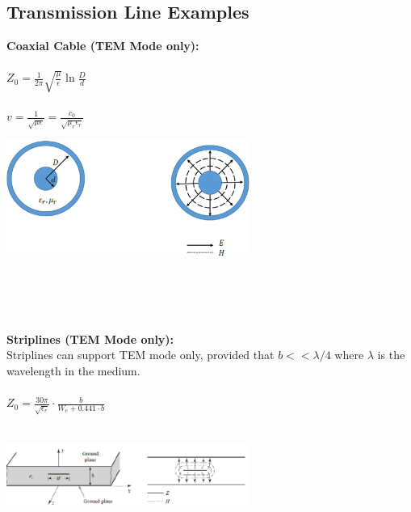 \subsection{Transmission Line Examples}

\begin{minipage}{6cm}
	\textbf{Coaxial Cable (TEM Mode only):}\\ \\
	$ Z_0 = \frac{1}{2\pi}\sqrt{\frac{\mu}{\epsilon}}\ln\frac{D}{d}$\\ \\
	$ v = \frac{1}{\sqrt{\mu \epsilon}} = \frac{c_0}{\sqrt{\mu_r \epsilon_r}}$
\end{minipage}
\hspace{4cm}
\begin{minipage}{8cm}
	\includegraphics[width=8cm]{./images/Coax.png}
\end{minipage}
\\
\\
\\
\begin{minipage}{6cm}
	\textbf{Striplines (TEM Mode only):}\\ 
	Striplines can support TEM mode only, provided that $b<< \lambda/4$ where $\lambda$ is the wavelength in the medium.\\ \\
	$ Z_0 = \frac{30\pi}{\sqrt{\epsilon_r}}\cdot \frac{b}{W_e + 0.441\cdot b}$\\ \\
\end{minipage}
\hspace{4cm}
\begin{minipage}{8cm}
	\includegraphics[width=8cm]{./images/Stripline.png}
\end{minipage}
\\
\\
\\
